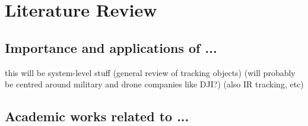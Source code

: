 \chapter{Literature Review}

\section{Importance and applications of ...}
this will be system-level stuff (general review of tracking objects) (will probably be centred around military and drone companies like DJI?) (also IR tracking, etc)

\section{Academic works related to ...}
